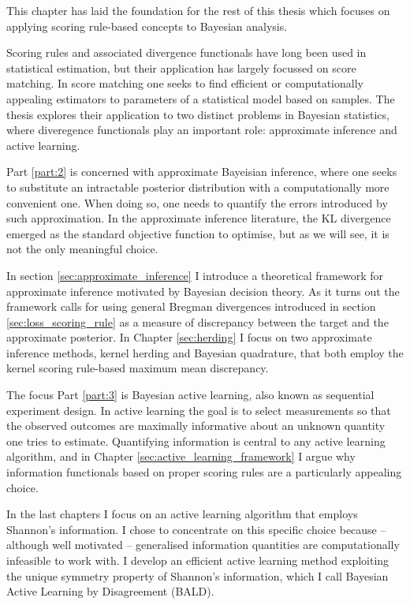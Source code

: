 This chapter has laid the foundation for the rest of this thesis which focuses on applying scoring rule-based concepts to Bayesian analysis.

Scoring rules and associated divergence functionals have long been used in statistical estimation, but their application has largely focussed on score matching. In score matching one seeks to find efficient or computationally appealing estimators to parameters of a statistical model based on \iid samples. The thesis explores their application to two distinct problems in Bayesian statistics, where diveregence functionals play an important role: approximate inference and active learning.

Part \ref{part:2} is concerned with approximate Bayeisian inference, where one seeks to substitute an intractable posterior distribution with a computationally more convenient one. When doing so, one needs to quantify the errors introduced by such approximation. In the approximate inference literature, the KL divergence emerged as the standard objective function to optimise, but as we will see, it is not the only meaningful choice.

In section \ref{sec:approximate_inference} I introduce a theoretical framework for approximate inference motivated by Bayesian decision theory. As it turns out the framework calls for using general Bregman divergences introduced in section \ref{sec:loss_scoring_rule} as a measure of discrepancy between the target and the approximate posterior. In Chapter \ref{sec:herding} I focus on two approximate inference methods, kernel herding and Bayesian quadrature, that both employ the kernel scoring rule-based maximum mean discrepancy.

The focus Part \ref{part:3} is Bayesian active learning, also known as sequential experiment design. In active learning the goal is to select measurements so that the observed outcomes are maximally informative about an unknown quantity one tries to estimate. Quantifying information is central to any active learning algorithm, and in Chapter \ref{sec:active_learning_framework} I argue why information functionals based on proper scoring rules are a particularly appealing choice.

In the last chapters I focus on an active learning algorithm that employs Shannon's information. I chose to concentrate on this specific choice because -- although well motivated -- generalised information quantities are computationally infeasible to work with. I develop an efficient active learning method exploiting the unique symmetry property of Shannon's information, which I call Bayesian Active Learning by Disagreement (BALD).
\cbend